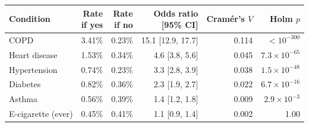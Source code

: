\begin{tabular}{lrrrrr}
\toprule
Condition & \makecell[b]{Rate\\{}if yes} & \makecell[b]{Rate\\{}if no} & \makecell[b]{Odds ratio\\{}[95\% CI]} & Cram\'er's $V$ & Holm $p$ \\
\midrule
COPD & 3.41\% & 0.23\% & 15.1 [12.9, 17.7] & 0.114 & $<10^{-300}$ \\
Heart disease & 1.53\% & 0.34\% & 4.6 [3.8, 5.6] & 0.045 & $7.3\times10^{-65}$ \\
Hypertension & 0.74\% & 0.23\% & 3.3 [2.8, 3.9] & 0.038 & $1.5\times10^{-48}$ \\
Diabetes & 0.82\% & 0.36\% & 2.3 [1.9, 2.7] & 0.022 & $6.7\times10^{-16}$ \\
Asthma & 0.56\% & 0.39\% & 1.4 [1.2, 1.8] & 0.009 & $2.9\times10^{-3}$ \\
E-cigarette (ever) & 0.45\% & 0.41\% & 1.1 [0.9, 1.4] & 0.002 & 1.00 \\
\bottomrule
\end{tabular}
